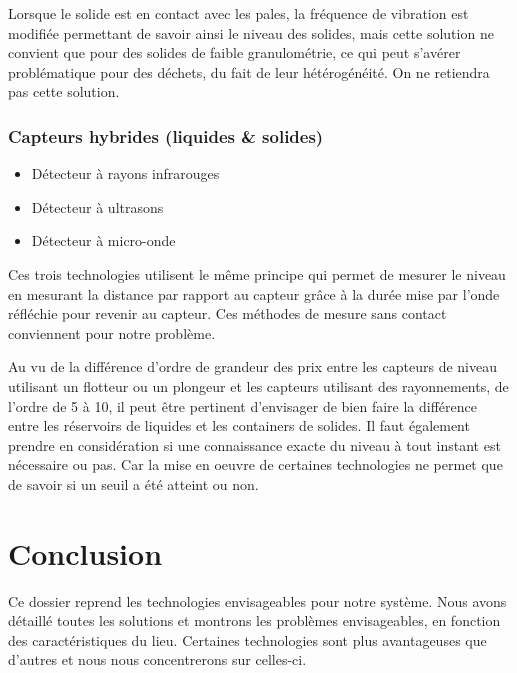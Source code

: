 Lorsque le solide est en contact avec les pales, la fréquence de vibration est modifiée permettant de savoir ainsi le niveau des solides, mais cette solution ne convient que pour des solides de faible granulométrie, ce qui peut s'avérer problématique pour des déchets, du fait de leur hétérogénéité. On ne retiendra pas cette solution.

\subsubsection{Capteurs hybrides (liquides \&  solides)}

\begin{itemize}
\item Détecteur à rayons infrarouges
\item Détecteur à ultrasons
\item Détecteur à micro-onde
\end{itemize}

Ces trois technologies utilisent le même principe qui permet de mesurer le niveau en mesurant la distance par rapport au capteur grâce à la durée mise par l'onde réfléchie pour revenir au capteur. Ces méthodes de mesure sans contact conviennent pour notre problème.

Au vu de la différence d'ordre de grandeur des prix entre les capteurs de niveau utilisant un flotteur ou un plongeur et les capteurs utilisant des rayonnements, de l'ordre de 5 à 10\footnotemark, il peut être pertinent d'envisager de bien faire la différence entre les réservoirs de liquides et les containers de solides. Il faut également prendre en considération si une connaissance exacte du niveau à tout instant est nécessaire ou pas. Car la mise en oeuvre de certaines technologies ne permet que de savoir si un seuil a été atteint ou non.


\section{Conclusion}

Ce dossier reprend les technologies envisageables pour notre système. Nous avons détaillé toutes les solutions et montrons les problèmes envisageables, en fonction des caractéristiques du lieu. Certaines technologies sont plus avantageuses que d'autres et nous nous concentrerons sur celles-ci.

